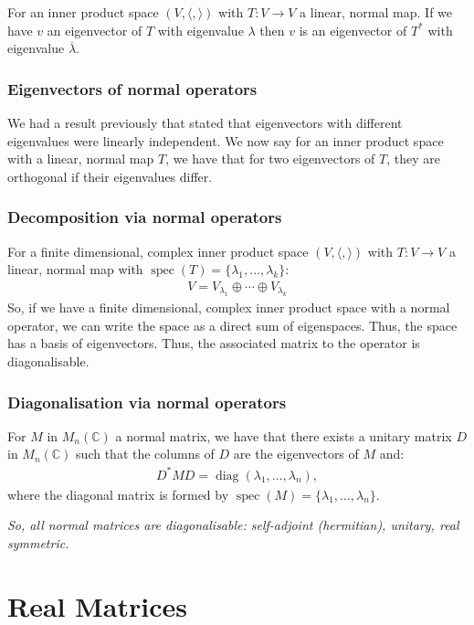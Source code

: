 \documentclass[a4paper, 12pt, twoside]{article}
\DeclareMathOperator{\Diag}{diag}
\DeclareMathOperator{\Spec}{spec}
\begin{document}
For an inner product space $(V, \langle , \rangle)$ with 
$T : V \to V$ a linear, normal map. If we have $v$ an eigenvector
of $T$ with eigenvalue $\lambda$ then $v$ is an eigenvector of $T^*$
with eigenvalue $\overline{\lambda}$.

\subsubsection{Eigenvectors of normal operators}

We had a result previously that stated that eigenvectors with
different eigenvalues were linearly independent. We now say for 
an inner product space with a linear, normal map $T$, we
have that for two eigenvectors of $T$, they are orthogonal if
their eigenvalues differ.

\subsubsection{Decomposition via normal operators}

For a finite dimensional, complex inner product space 
$(V, \langle , \rangle)$ with $T : V \to V$ a linear, normal map with
$\Spec(T) = \{\lambda_1, \ldots, \lambda_k\}$:
\begin{align*}
  V = V_{\lambda_1} \oplus \cdots \oplus V_{\lambda_k}
\end{align*}
So, if we have a finite dimensional, complex inner product 
space with a normal operator, we can write the space as a direct
sum of eigenspaces. Thus, the space has a basis of eigenvectors.
Thus, the associated matrix to the operator is diagonalisable.

\subsubsection{Diagonalisation via normal operators}

For $M$ in $M_n(\mathbb{C})$ a normal matrix, we have that there
exists a unitary matrix $D$ in $M_n(\mathbb{C})$ such that the
columns of $D$ are the eigenvectors of $M$ and:
\begin{align*}
  D^*MD = \Diag(\lambda_1, \ldots, \lambda_n),
\end{align*}
where the diagonal matrix is formed by 
$\Spec(M) = \{\lambda_1, \ldots, \lambda_n\}$.

\textit{So, all normal matrices are diagonalisable: 
self-adjoint (hermitian), unitary, real symmetric.}

\section{Real Matrices}
\end{document}
